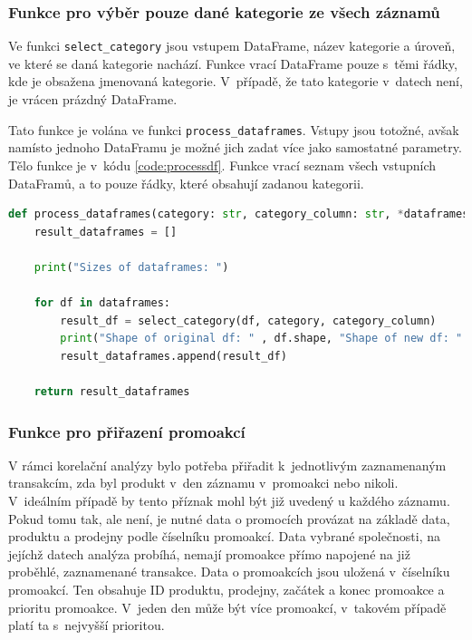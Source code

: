 \subsubsection*{Funkce pro výběr pouze dané kategorie ze všech záznamů}
Ve funkci \texttt{select\_category} jsou vstupem DataFrame, název kategorie a úroveň, ve které se daná kategorie nachází. Funkce vrací DataFrame pouze s~těmi řádky, kde je obsažena jmenovaná kategorie. V~případě, že tato kategorie v~datech není, je vrácen prázdný DataFrame.

Tato funkce je volána ve funkci \texttt{process\_dataframes}. Vstupy jsou totožné, avšak namísto jednoho DataFramu je možné jich zadat více jako samostatné parametry. Tělo funkce je v~kódu \ref*{code:processdf}. Funkce vrací seznam všech vstupních DataFramů, a to pouze řádky, které obsahují zadanou kategorii.

\begin{lstlisting}[language=Python,style=mystyle, label={code:processdf},  caption={Funkce pro výběr pouze dané katageorie z~více DataFramů.}]
def process_dataframes(category: str, category_column: str, *dataframes) -> list[pd.DataFrame]:
    result_dataframes = []

    print("Sizes of dataframes: ")

    for df in dataframes:
        result_df = select_category(df, category, category_column)
        print("Shape of original df: " , df.shape, "Shape of new df: " , result_df.shape)
        result_dataframes.append(result_df)

    return result_dataframes
\end{lstlisting}

\subsubsection*{Funkce pro přiřazení promoakcí}

V rámci korelační analýzy bylo potřeba přiřadit k~jednotlivým zaznamenaným transakcím, zda byl produkt v~den záznamu v~promoakci nebo nikoli. V~ideálním případě by tento příznak mohl být již uvedený u každého záznamu. Pokud tomu tak, ale není, je nutné data o promocích provázat na základě data, produktu a prodejny podle číselníku promoakcí. Data vybrané společnosti, na jejíchž datech analýza probíhá, nemají promoakce přímo napojené na již proběhlé, zaznamenané transakce. Data o promoakcích jsou uložená v~číselníku promoakcí. Ten obsahuje ID produktu, prodejny, začátek a konec promoakce a prioritu promoakce. V~jeden den může být více promoakcí, v~takovém případě platí ta s~nejvyšší prioritou.

